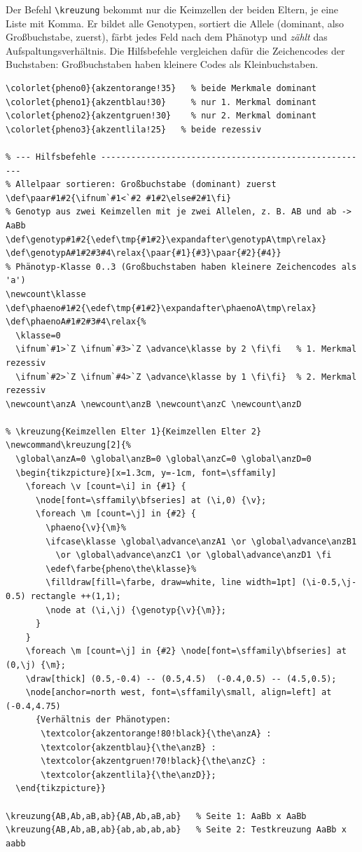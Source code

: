 Der Befehl \texttt{\textbackslash kreuzung} bekommt nur die Keimzellen der beiden Eltern, je eine Liste mit Komma. Er bildet alle Genotypen, sortiert die Allele (dominant, also Großbuchstabe, zuerst), färbt jedes Feld nach dem Phänotyp und \textit{zählt} das Aufspaltungsverhältnis. Die Hilfsbefehle vergleichen dafür die Zeichencodes der Buchstaben: Großbuchstaben haben kleinere Codes als Kleinbuchstaben.

\begin{lstlisting}[style=latex]
\colorlet{pheno0}{akzentorange!35}   % beide Merkmale dominant
\colorlet{pheno1}{akzentblau!30}     % nur 1. Merkmal dominant
\colorlet{pheno2}{akzentgruen!30}    % nur 2. Merkmal dominant
\colorlet{pheno3}{akzentlila!25}   % beide rezessiv

% --- Hilfsbefehle ------------------------------------------------------
% Allelpaar sortieren: Großbuchstabe (dominant) zuerst
\def\paar#1#2{\ifnum`#1<`#2 #1#2\else#2#1\fi}
% Genotyp aus zwei Keimzellen mit je zwei Allelen, z. B. AB und ab -> AaBb
\def\genotyp#1#2{\edef\tmp{#1#2}\expandafter\genotypA\tmp\relax}
\def\genotypA#1#2#3#4\relax{\paar{#1}{#3}\paar{#2}{#4}}
% Phänotyp-Klasse 0..3 (Großbuchstaben haben kleinere Zeichencodes als 'a')
\newcount\klasse
\def\phaeno#1#2{\edef\tmp{#1#2}\expandafter\phaenoA\tmp\relax}
\def\phaenoA#1#2#3#4\relax{%
  \klasse=0
  \ifnum`#1>`Z \ifnum`#3>`Z \advance\klasse by 2 \fi\fi   % 1. Merkmal rezessiv
  \ifnum`#2>`Z \ifnum`#4>`Z \advance\klasse by 1 \fi\fi}  % 2. Merkmal rezessiv
\newcount\anzA \newcount\anzB \newcount\anzC \newcount\anzD

% \kreuzung{Keimzellen Elter 1}{Keimzellen Elter 2}
\newcommand\kreuzung[2]{%
  \global\anzA=0 \global\anzB=0 \global\anzC=0 \global\anzD=0
  \begin{tikzpicture}[x=1.3cm, y=-1cm, font=\sffamily]
    \foreach \v [count=\i] in {#1} {
      \node[font=\sffamily\bfseries] at (\i,0) {\v};
      \foreach \m [count=\j] in {#2} {
        \phaeno{\v}{\m}%
        \ifcase\klasse \global\advance\anzA1 \or \global\advance\anzB1
          \or \global\advance\anzC1 \or \global\advance\anzD1 \fi
        \edef\farbe{pheno\the\klasse}%
        \filldraw[fill=\farbe, draw=white, line width=1pt] (\i-0.5,\j-0.5) rectangle ++(1,1);
        \node at (\i,\j) {\genotyp{\v}{\m}};
      }
    }
    \foreach \m [count=\j] in {#2} \node[font=\sffamily\bfseries] at (0,\j) {\m};
    \draw[thick] (0.5,-0.4) -- (0.5,4.5)  (-0.4,0.5) -- (4.5,0.5);
    \node[anchor=north west, font=\sffamily\small, align=left] at (-0.4,4.75)
      {Verhältnis der Phänotypen:
       \textcolor{akzentorange!80!black}{\the\anzA} :
       \textcolor{akzentblau}{\the\anzB} :
       \textcolor{akzentgruen!70!black}{\the\anzC} :
       \textcolor{akzentlila}{\the\anzD}};
  \end{tikzpicture}}

\kreuzung{AB,Ab,aB,ab}{AB,Ab,aB,ab}   % Seite 1: AaBb x AaBb
\kreuzung{AB,Ab,aB,ab}{ab,ab,ab,ab}   % Seite 2: Testkreuzung AaBb x aabb
\end{lstlisting}

